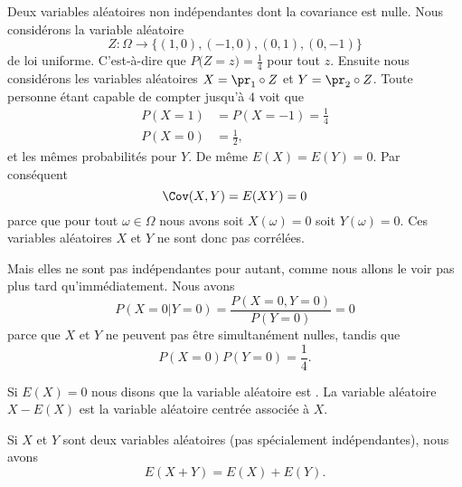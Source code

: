 \begin{example} \label{ExWLzkuWd}
	Deux variables aléatoires non indépendantes dont la covariance est nulle. Nous considérons la variable aléatoire
	\begin{equation}
		Z\colon \Omega\to \{ (1,0),(-1,0),(0,1),(0,-1) \}
	\end{equation}
	de loi uniforme. C'est-à-dire que \(  P\big( Z=z \big)=\frac{1}{ 4 }  \) pour tout \( z\). Ensuite nous considérons les variables aléatoires \( X=\pr_1\circ Z\) et \( Y=\pr_2\circ Z\). Toute personne étant capable de compter jusqu'à \( 4\) voit que
	\begin{subequations}
		\begin{align}
			P(X=1) & =P(X=-1)=\frac{1}{ 4 } \\
			P(X=0) & =\frac{ 1 }{2},
		\end{align}
	\end{subequations}
	et les mêmes probabilités pour \( Y\). De même \( E(X)=E(Y)=0\). Par conséquent
	\begin{equation}
		\Cov(X,Y)=E(XY)=0
	\end{equation}
	parce que pour tout \( \omega\in \Omega\) nous avons soit \( X(\omega)=0\) soit \( Y(\omega)=0\). Ces variables aléatoires \( X\) et \( Y\) ne sont donc pas corrélées.

	Mais elles ne sont pas indépendantes pour autant, comme nous allons le voir pas plus tard qu'immédiatement. Nous avons
	\begin{equation}
		P(X=0|Y=0)=\frac{ P(X=0,Y=0) }{ P(Y=0) }=0
	\end{equation}
	parce que \( X\) et \( Y\) ne peuvent pas être simultanément nulles, tandis que
	\begin{equation}
		P(X=0)P(Y=0)=\frac{1}{ 4 }.
	\end{equation}
\end{example}

\begin{definition}
	Si \( E(X)=0\) nous disons que la variable aléatoire est . La variable aléatoire \( X-E(X)\) est la variable aléatoire centrée associée à \( X\).
\end{definition}

\begin{proposition} \label{PropZBnsCgh}
	Si \( X\) et \( Y\) sont deux variables aléatoires (pas spécialement indépendantes), nous avons
	\begin{equation}
		E(X+Y)=E(X)+E(Y).
	\end{equation}
\end{proposition}

